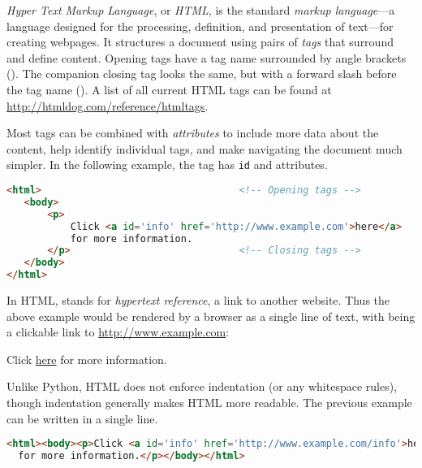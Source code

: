 \emph{Hyper Text Markup Language}, or \emph{HTML}, is the standard \emph{markup language}---a language designed for the processing, definition, and presentation of text---for creating webpages.
It structures a document using pairs of \emph{tags} that surround and define content.
Opening tags have a tag name surrounded by angle brackets ().
The companion closing tag looks the same, but with a forward slash before the tag name ().
A list of all current HTML tags can be found at \url{http://htmldog.com/reference/htmltags}.

Most tags can be combined with \emph{attributes} to include more data about the content, help identify individual tags, and make navigating the document much simpler.
In the following example, the  tag has \lstinline[language=HTML]{id} and  attributes.

\begin{lstlisting}[language=HTML]
<html>                                  <!-- Opening tags -->
   <body>
       <p>
           Click <a id='info' href='http://www.example.com'>here</a>
           for more information.
       </p>                             <!-- Closing tags -->
   </body>
</html>
\end{lstlisting}

In HTML,  stands for \emph{hypertext reference}, a link to another website.
Thus the above example would be rendered by a browser as a single line of text, with  being a clickable link to \url{http://www.example.com}:

\begin{center}
Click \href{http://www.example.com}{here} for more information.
\end{center}

Unlike Python, HTML does not enforce indentation (or any whitespace rules), though indentation generally makes HTML more readable.
The previous example can be written in a single line.

\begin{lstlisting}[language=HTML]
<html><body><p>Click <a id='info' href='http://www.example.com/info'>here</a>
  for more information.</p></body></html>
\end{lstlisting}

